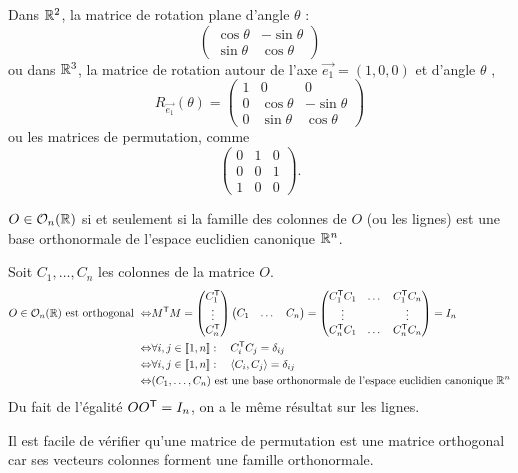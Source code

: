 \documentclass{book}
\begin{document}
\begin{Exemple} Dans $\mathbb{R}^2$, la matrice de rotation plane d'angle $\theta  $ :
$${\begin{pmatrix}\cos \theta &-\sin \theta \\\sin \theta &\cos \theta \end{pmatrix}}$$
ou dans $\mathbb{R}^3$, la matrice de rotation autour de  l'axe $\vec{e_1}=(1,0,0)$ et d'angle $\theta  $ ,
$$
 R_{\vec{e_1}}(\theta )={\begin{pmatrix}1&0&0\\0&\cos \theta &-\sin \theta \\0&\sin \theta &\cos \theta \end{pmatrix}}$$
ou les matrices de permutation, comme
$$
{\displaystyle {\begin{pmatrix}0&1&0\\0&0&1\\1&0&0\end{pmatrix}}.}$$
\end{Exemple}
\begin{Proposition}
$O \in \mathcal{O}_{n}(\mathbb{R})$ si et seulement si la famille des colonnes de $O$ (ou les lignes) est une base orthonormale de l'espace euclidien canonique $\mathbb{R}^n$.
\end{Proposition}
\begin{Demonstration}
Soit $C_1,\dots,C_n$ les colonnes de la matrice $O$.
$$\begin{aligned}
O \in \mathcal{O}_{n}(\mathbb{R})\text{  est  orthogonal } \Leftrightarrow&  M^{\mathsf {T}} M =\begin{pmatrix}
C_1^{\mathsf {T}}\\\vdots\\C_n^{\mathsf {T}}
\end{pmatrix} \begin{pmatrix}
C_1&\dots&C_n
\end{pmatrix}=\begin{pmatrix}
C_1^{\mathsf {T}}C_1 &\dots&C_1^{\mathsf {T}}C_n\\
\vdots &&\vdots\\
C_n^{\mathsf {T}}C_1&\dots&C_n^{\mathsf {T}}C_n\\
\end{pmatrix} =  I_n\\
 \Leftrightarrow& \forall i,j\in\mathopen\lbrack\!\lbrack1,n \mathclose\rbrack\!\rbrack :\quad C_i^{\mathsf {T}}C_j=\delta_{ij}\\
\Leftrightarrow& \forall i,j\in\mathopen\lbrack\!\lbrack1,n \mathclose\rbrack\!\rbrack :\quad \langle C_i,C_j\rangle=\delta_{ij}\\
\Leftrightarrow& (C_1,\dots,C_n)\text{ est une base orthonormale de l'espace euclidien canonique } \mathbb{R}^n
\end{aligned}$$ 
Du fait de l'égalité $ OO^{\mathsf {T}}=I_n$, on a le même résultat sur les lignes.
\end{Demonstration} 
\begin{Exemple}
Il est facile de vérifier qu'une matrice de permutation est une matrice orthogonal car ses vecteurs colonnes forment une famille orthonormale. 
\end{Exemple}
\end{document}
